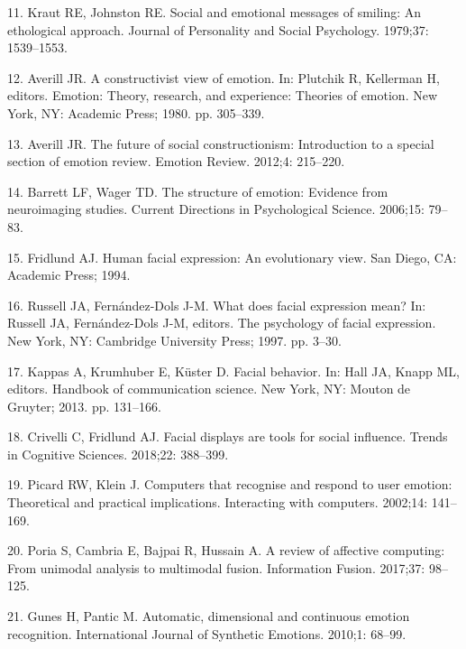 \documentclass[10pt,letterpaper]{article}
\begin{document}
\leavevmode\hypertarget{ref-kraut1979social}{}%
11. Kraut RE, Johnston RE. Social and emotional messages of smiling: An ethological approach. Journal of Personality and Social Psychology. 1979;37: 1539--1553.

\leavevmode\hypertarget{ref-averill1980constructivist}{}%
12. Averill JR. A constructivist view of emotion. In: Plutchik R, Kellerman H, editors. Emotion: Theory, research, and experience: Theories of emotion. New York, NY: Academic Press; 1980. pp. 305--339.

\leavevmode\hypertarget{ref-averill2012future}{}%
13. Averill JR. The future of social constructionism: Introduction to a special section of emotion review. Emotion Review. 2012;4: 215--220.

\leavevmode\hypertarget{ref-barrett2006structure}{}%
14. Barrett LF, Wager TD. The structure of emotion: Evidence from neuroimaging studies. Current Directions in Psychological Science. 2006;15: 79--83.

\leavevmode\hypertarget{ref-fridlund1994human}{}%
15. Fridlund AJ. Human facial expression: An evolutionary view. San Diego, CA: Academic Press; 1994.

\leavevmode\hypertarget{ref-russell1997facial}{}%
16. Russell JA, Fernández-Dols J-M. What does facial expression mean? In: Russell JA, Fernández-Dols J-M, editors. The psychology of facial expression. New York, NY: Cambridge University Press; 1997. pp. 3--30.

\leavevmode\hypertarget{ref-kappas2013facial}{}%
17. Kappas A, Krumhuber E, Küster D. Facial behavior. In: Hall JA, Knapp ML, editors. Handbook of communication science. New York, NY: Mouton de Gruyter; 2013. pp. 131--166.

\leavevmode\hypertarget{ref-crivelli2018facial}{}%
18. Crivelli C, Fridlund AJ. Facial displays are tools for social influence. Trends in Cognitive Sciences. 2018;22: 388--399.

\leavevmode\hypertarget{ref-picard2002computers}{}%
19. Picard RW, Klein J. Computers that recognise and respond to user emotion: Theoretical and practical implications. Interacting with computers. 2002;14: 141--169.

\leavevmode\hypertarget{ref-poria2017review}{}%
20. Poria S, Cambria E, Bajpai R, Hussain A. A review of affective computing: From unimodal analysis to multimodal fusion. Information Fusion. 2017;37: 98--125.

\leavevmode\hypertarget{ref-gunes2010automatic}{}%
21. Gunes H, Pantic M. Automatic, dimensional and continuous emotion recognition. International Journal of Synthetic Emotions. 2010;1: 68--99.
\end{document}

